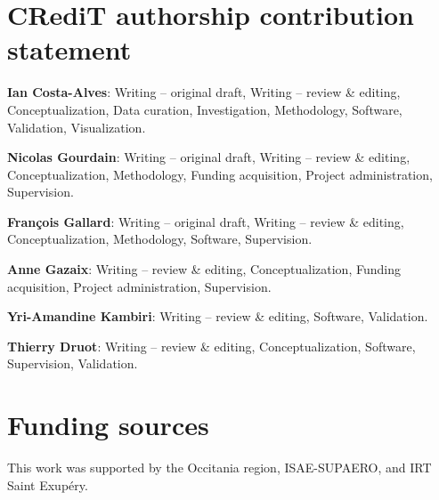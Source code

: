 \documentclass[a4paper,fleqn]{cas-dc}
\begin{document}
\section*{CRediT authorship contribution statement}

\textbf{Ian Costa-Alves}: Writing – original draft, Writing – review \& editing, Conceptualization, Data curation, Investigation, Methodology, Software, Validation, Visualization.

\textbf{Nicolas Gourdain}: Writing – original draft, Writing – review \& editing, Conceptualization, Methodology, Funding acquisition, Project administration, Supervision.

\textbf{François Gallard}: Writing – original draft, Writing – review \& editing, Conceptualization, Methodology, Software, Supervision.

\textbf{Anne Gazaix}: Writing – review \& editing, Conceptualization, Funding acquisition, Project administration, Supervision.

\textbf{Yri-Amandine Kambiri}: Writing – review \& editing, Software, Validation.

\textbf{Thierry Druot}: Writing – review \& editing, Conceptualization, Software, Supervision, Validation.

\section*{Funding sources}

This work was supported by the Occitania region, ISAE-SUPAERO, and IRT Saint Exupéry.

% 
% 



\end{document}
